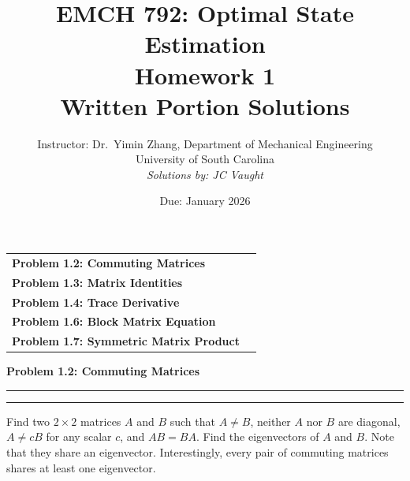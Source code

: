 \documentclass[12pt]{article}
\title{EMCH 792: Optimal State Estimation \\ Homework 1 \\ \large{Written Portion Solutions}}
\author{Instructor: Dr.\ Yimin Zhang, Department of Mechanical Engineering \\ University of South Carolina \\ \textit{Solutions by: JC Vaught}}
\date{Due: January 2026}
\newcommand{\question}[1]{%
  \clearpage
  \vspace{0.5cm}
  {\noindent\normalsize \textbf{#1}}
  \vspace{0.2cm}
  \hrule
  \vspace{0.1cm}
  \hrule
  \vspace{0.3cm}
}
\begin{document}
\maketitle
\setlength{\parindent}{0pt}


\begin{center}
\begin{tcolorbox}[colback=white, colframe=gray!50!black, colbacktitle=gray!20!white,
                  coltitle=black, sharp corners, boxrule=1pt,
                  title=\Large\bfseries Table of Contents]
\begin{tabular}{p{}r}
\textbf{Problem 1.2: Commuting Matrices} \dotfill & \textbf{\pageref{quest:1.2}} \\[0.3em]
\textbf{Problem 1.3: Matrix Identities} \dotfill & \textbf{\pageref{quest:1.3}} \\[0.3em]
\textbf{Problem 1.4: Trace Derivative} \dotfill & \textbf{\pageref{quest:1.4}} \\[0.3em]
\textbf{Problem 1.6: Block Matrix Equation} \dotfill & \textbf{\pageref{quest:1.6}} \\[0.3em]
\textbf{Problem 1.7: Symmetric Matrix Product} \dotfill & \textbf{\pageref{quest:1.7}} \\
\end{tabular}
\vspace{0.2cm}
\end{tcolorbox}
\end{center}

\vspace{0.5cm}


\question{Problem 1.2: Commuting Matrices}\label{quest:1.2}

\begin{problembox}
Find two $2 \times 2$ matrices $A$ and $B$ such that $A \neq B$, neither $A$ nor $B$ are diagonal, $A \neq cB$ for any scalar $c$, and $AB = BA$. Find the eigenvectors of $A$ and $B$. Note that they share an eigenvector. Interestingly, every pair of commuting matrices shares at least one eigenvector.
\end{problembox}
\end{document}
